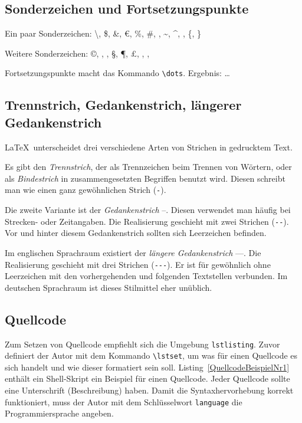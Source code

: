 \documentclass{llncs}
\begin{document}
\subsection{Sonderzeichen und Fortsetzungspunkte}

Ein paar Sonderzeichen: \textbackslash, \$, \&, \euro, \%, \#, \textunderscore, \textasciitilde, \textasciicircum, \textbar, \{, \}

Weitere Sonderzeichen: \copyright, \textregistered, \texttrademark, \S, \P, \pounds, \dag, \ddag, \textbullet

Fortsetzungspunkte macht das Kommando \verb!\dots!. Ergebnis: \dots

\subsection{Trennstrich, Gedankenstrich, längerer Gedankenstrich}

\LaTeX\ unterscheidet drei verschiedene Arten von Strichen in gedrucktem Text.

Es gibt den \emph{Trennstrich}, der als Trennzeichen beim Trennen von Wörtern, oder als \emph{Bindestrich} in zusammengesetzten Begriffen benutzt wird. Diesen schreibt man wie einen ganz gewöhnlichen Strich (\verb!-!).

Die zweite Variante ist der \emph{Gedankenstrich} --. Diesen verwendet man häufig bei Strecken- oder Zeitangaben. Die Realisierung geschieht mit zwei Strichen (\verb!--!). Vor und hinter diesem Gedankenstrich sollten sich Leerzeichen befinden.

Im englischen Sprachraum existiert der \emph{längere
Gedankenstrich} ---. Die Realisierung geschieht mit drei Strichen (\verb!---!). Er ist für gewöhnlich ohne Leerzeichen mit den vorhergehenden und folgenden Textstellen verbunden. Im deutschen Sprachraum ist dieses Stilmittel eher unüblich.

\subsection{Quellcode}

Zum Setzen von Quellcode empfiehlt sich die Umgebung \verb!lstlisting!. Zuvor definiert der Autor mit dem Kommando \verb!\lstset!, um was für einen Quellcode es sich handelt und wie dieser formatiert sein soll. Listing~\ref{QuellcodeBeispielNr1} enthält ein Shell-Skript ein Beispiel für einen Quellcode. Jeder Quellcode sollte eine Unterschrift (Beschreibung) haben. Damit die Syntaxhervorhebung korrekt funktioniert, muss der Autor mit dem Schlüsselwort \verb!language! die Programmiersprache angeben. 
\end{document}
